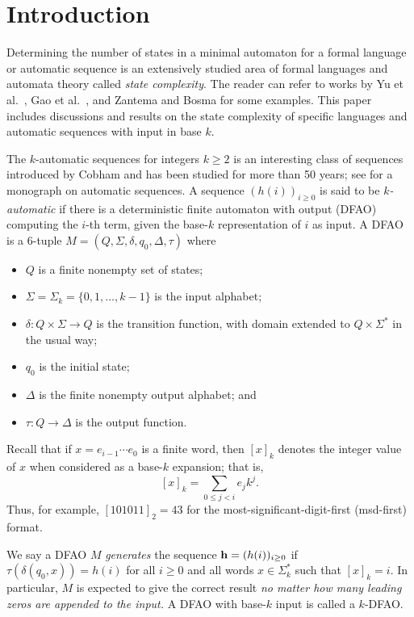 \documentclass[12pt,reqno]{article}
\begin{document}
\section{Introduction}

Determining the number of states in a minimal automaton for a formal language or automatic sequence is an extensively studied area of formal languages and automata theory called {\it state complexity}. The reader can refer to works by Yu et al.~\cite{yu_state_1994}, Gao et al.\ \cite{gao_survey_2016}, and Zantema and Bosma \cite{zantema_complexity_2022} for some examples. This paper includes discussions and results on the state complexity of specific languages and automatic sequences with input in base $k$.

The $k$-automatic sequences for integers $k\geq 2$ is an interesting class of sequences
introduced by Cobham \cite{cobham_base-dependence_1969,cobham_uniform_1972} and has been studied for more than 50 years; see 
\cite{allouche_automatic_2003} for a monograph on automatic sequences.
A sequence $(h(i))_{i \geq 0}$ is said to be {\it $k$-automatic\/} if there is a deterministic finite automaton with output (DFAO) computing the $i$-th term, given the base-$k$ representation of $i$ as input.
A DFAO is 
a $6$-tuple $M = (Q, \Sigma, \delta, q_0, \Delta, \tau)$ where
\begin{itemize} [nosep]
    \item $Q$ is a finite nonempty set of states;
    \item $\Sigma = \Sigma_k = \{0, 1,\ldots, k-1 \}$ is the input alphabet;
    \item $\delta:Q \times \Sigma \rightarrow Q$ is the transition
    function, with domain extended to
    $Q \times \Sigma^*$ in the usual way;
    \item $q_0$ is the initial state;
    \item $\Delta$ is the finite nonempty output alphabet; and
    \item $\tau:Q \rightarrow \Delta$ is
    the output function.
\end{itemize}

Recall that if $x = e_{i-1} \cdots e_0$
is a finite word, then $[x]_k$ denotes
the integer value of $x$ when considered as a base-$k$ expansion; that is, 
$$ [x]_k = \sum_{0 \leq j < i} e_j k^j.$$
Thus, for example, $[101011]_2 = 43$ for the most-significant-digit-first (msd-first) format.

We say a DFAO $M$ {\it generates\/} the sequence
${\bf h} = (h(i))_{i \geq 0}$ if
$\tau(\delta(q_0,x)) = h(i)$ for all $i \geq 0$ and all
words $x \in \Sigma_k^*$ such that $[x]_k = i$.  In particular, $M$ is expected to give the correct result {\it no matter how many leading zeros are appended to the input.} A DFAO with base-$k$ input is called  a $k$-DFAO.
\end{document}
